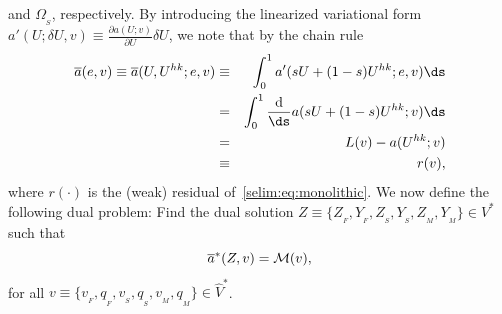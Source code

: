 and $\Omega_{_{S}}$, respectively. By introducing the linearized
variational form $a'(U; \delta U,v ) \equiv \frac{\partial
  a(U;v)}{\partial U}\delta U$, we note that by the chain rule
\begin{eqnarray}
\overline{a}(e, v) \equiv \overline{a}(U,U^{hk};e, v) &\equiv& \int_0^1 a'(sU + (1-s)U^{hk}; e,
v) \ds \\ &=& \int_0^1 \frac{\textrm{d}}{\ds} a (sU + (1-s)U^{hk}; v)
\ds \\ &=& L(v) - a(U^{hk};v) \\ &\equiv&  r(v),
\end{eqnarray}
where $r(\cdot)$ is the (weak) residual of~\eqref{selim:eq:monolithic}.
We now define the following dual problem: Find the dual solution
$Z\equiv \{ Z_{_{F}}, Y_{_{F}}, Z_{_{S}}, Y_{_{S}}, Z_{_{M}},
Y_{_{M}}\}\in V^*$ such that
\begin{equation}
  \label{selim:eq:dual}
  \overline{a}^{*}(Z, v) = \mathcal{M}(v),
\end{equation}
for all $v\equiv \{ v_{_{F}}, q_{_{F}}, v_{_{S}}, q_{_{S}}, v_{_{M}}, q_{_{M}}
\}\in\hat{V}^*$.

